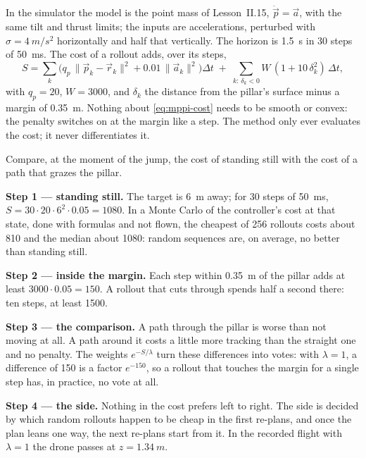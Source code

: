 In the simulator the model is the point mass of Lesson~II.15, $\ddot{\vec p} = \vec a$, with the same tilt and thrust limits; the inputs are accelerations, perturbed with $\sigma = \SI{4}{m/s^2}$ horizontally and half that vertically. The horizon is \SI{1.5}{s} in 30 steps of \SI{50}{ms}. The cost of a rollout adds, over its steps,
\begin{equation}\label{eq:mppi-cost}
  S = \sum_k \Big(q_p\,\|\vec p_k - \vec r_k\|^2 + 0.01\,\|\vec a_k\|^2\Big)\Delta t \;+\; \sum_{k:\,\delta_k < 0} W\,(1 + 10\,\delta_k^2)\,\Delta t,
\end{equation}
with $q_p = 20$, $W = 3000$, and $\delta_k$ the distance from the pillar's surface minus a margin of \SI{0.35}{m}. Nothing about \cref{eq:mppi-cost} needs to be smooth or convex: the penalty switches on at the margin like a step. The method only ever evaluates the cost; it never differentiates it.

\begin{example}
\label{ex:mppi-costs}
Compare, at the moment of the jump, the cost of standing still with the cost of a path that grazes the pillar.

\textbf{Step 1 — standing still.} The target is \SI{6}{m} away; for 30 steps of \SI{50}{ms}, $S = 30 \cdot 20 \cdot 6^2 \cdot 0.05 = 1080$. In a Monte Carlo of the controller's cost at that state, done with formulas and not flown, the cheapest of 256 rollouts costs about 810 and the median about 1080: random sequences are, on average, no better than standing still.

\textbf{Step 2 — inside the margin.} Each step within \SI{0.35}{m} of the pillar adds at least $3000 \cdot 0.05 = 150$. A rollout that cuts through spends half a second there: ten steps, at least 1500.

\textbf{Step 3 — the comparison.} A path through the pillar is worse than not moving at all. A path around it costs a little more tracking than the straight one and no penalty. The weights $e^{-S/\lambda}$ turn these differences into votes: with $\lambda = 1$, a difference of 150 is a factor $e^{-150}$, so a rollout that touches the margin for a single step has, in practice, no vote at all.

\textbf{Step 4 — the side.} Nothing in the cost prefers left to right. The side is decided by which random rollouts happen to be cheap in the first re-plans, and once the plan leans one way, the next re-plans start from it. In the recorded flight with $\lambda = 1$ the drone passes at $z = \SI{+1.34}{m}$.
\end{example}

